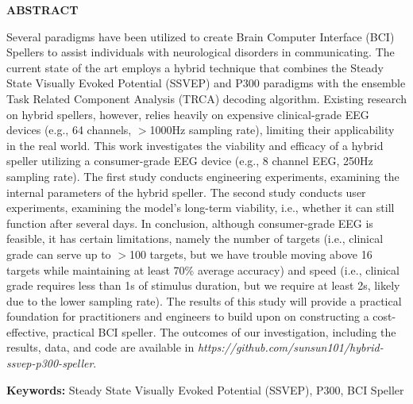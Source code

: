 {}

\begin{center}
    \large{\bf ABSTRACT}
\end{center}

Several paradigms have been utilized to create Brain Computer Interface (BCI) Spellers to assist individuals with neurological disorders in communicating. The current state of the art employs a hybrid technique that combines the Steady State Visually Evoked Potential (SSVEP) and P300 paradigms with the ensemble Task Related Component Analysis (TRCA) decoding algorithm. Existing research on hybrid spellers, however, relies heavily on expensive clinical-grade EEG devices (e.g., 64 channels, $>$1000Hz sampling rate), limiting their applicability in the real world. This work investigates the viability and efficacy of a hybrid speller utilizing a consumer-grade EEG device (e.g., 8 channel EEG, 250Hz sampling rate).  The first study conducts engineering experiments, examining the internal parameters of the hybrid speller.   The second study conducts user experiments, examining the model's long-term viability, i.e., whether it can still function after several days. In conclusion, although consumer-grade EEG is feasible, it has certain limitations, namely the number of targets (i.e., clinical grade can serve up to $>$100 targets, but we have trouble moving above 16 targets while maintaining at least 70\% average accuracy) and speed (i.e., clinical grade requires less than 1s of stimulus duration, but we require at least 2s, likely due to the lower sampling rate).   The results of this study will provide a practical foundation for practitioners and engineers to build upon on constructing a cost-effective, practical BCI speller.  The outcomes of our investigation, including the results, data, and code are available in \textit{https://github.com/sunsun101/hybrid-ssvep-p300-speller}.

\textbf{Keywords:} Steady State Visually Evoked Potential (SSVEP), P300, BCI Speller
